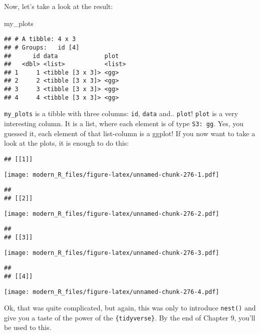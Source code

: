 \documentclass[
]{article}
\newenvironment{Shaded}{\begin{snugshade}}{\end{snugshade}}
\newcommand{\NormalTok}[1]{#1}
\newcommand{\OperatorTok}[1]{\textcolor[rgb]{0.81,0.36,0.00}{\textbf{#1}}}
\begin{document}
Now, let's take a look at the result:

\begin{Shaded}
\begin{Highlighting}[]
\NormalTok{my\_plots}
\end{Highlighting}
\end{Shaded}

\begin{verbatim}
## # A tibble: 4 x 3
## # Groups:   id [4]
##      id data             plot  
##   <dbl> <list>           <list>
## 1     1 <tibble [3 x 3]> <gg>  
## 2     2 <tibble [3 x 3]> <gg>  
## 3     3 <tibble [3 x 3]> <gg>  
## 4     4 <tibble [3 x 3]> <gg>
\end{verbatim}

\texttt{my\_plots} is a tibble with three columns: \texttt{id}, \texttt{data} and.. \texttt{plot}! \texttt{plot} is a very interesting
column. It is a list, where each element is of type \texttt{S3:\ gg}. Yes, you guessed it, each element of
that list-column is a ggplot! If you now want to take a look at the plots, it is enough to do this:

\begin{Shaded}
\end{Shaded}

\begin{verbatim}
## [[1]]
\end{verbatim}

\texttt{[image: modern\_R\_files/figure-latex/unnamed-chunk-276-1.pdf]}

\begin{verbatim}
## 
## [[2]]
\end{verbatim}

\texttt{[image: modern\_R\_files/figure-latex/unnamed-chunk-276-2.pdf]}

\begin{verbatim}
## 
## [[3]]
\end{verbatim}

\texttt{[image: modern\_R\_files/figure-latex/unnamed-chunk-276-3.pdf]}

\begin{verbatim}
## 
## [[4]]
\end{verbatim}

\texttt{[image: modern\_R\_files/figure-latex/unnamed-chunk-276-4.pdf]}

Ok, that was quite complicated, but again, this was only to introduce \texttt{nest()} and give you a taste
of the power of the \texttt{\{tidyverse\}}. By the end of Chapter 9, you'll be used to this.
\end{document}

